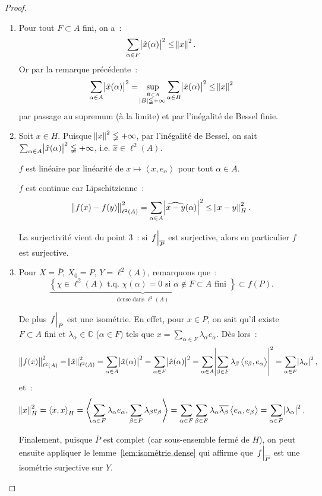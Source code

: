 \documentclass{report}
\newcommand{\C}{{\mathbb C}}
\newcommand{\scpr}[2]{\left\langle#1, #2\right\rangle}
\newcommand{\tq}{\text{ t.q. }}
\newcommand{\pinfty}{{+\infty}}
\newcommand{\restr}[2]{\left.#1\vphantom{\big|}\right|_{#2}}
\theoremstyle{definition}
\theoremstyle{remark}
\begin{document}
\begin{proof}~
\begin{enumerate}
	\item Pour tout $F \subset A$ fini, on a~:
	\[\sum_{\alpha \in F}\abs {\hat x(\alpha)}^2 \leq \norm x^2.\]
	Or par la remarque précédente~:
	\[\sum_{\alpha \in A}\abs {\hat x(\alpha)}^2 = \sup_{\stackrel {B \subset A}{\abs B \lneqq \pinfty}}\sum_{\alpha \in B}\abs {\hat x(\alpha)}^2 \leq \norm x^2\]
	par passage au supremum (à la limite) et par l'inégalité de Bessel finie.
	\item Soit $x \in H$. Puisque $\norm x^2 \lneqq \pinfty$, par l'inégalité de Bessel, on sait $\sum_{\alpha \in A}\abs {\hat x(\alpha)}^2 \lneqq \pinfty$, i.e. $\hat x \in \ell^2(A)$.

	$f$ est linéaire par linéarité de $x \mapsto \scpr x{e_\alpha}$ pour tout $\alpha \in A$.

	$f$ est continue car Lipschitzienne~:
	\[\norm {f(x)-f(y)}_{\ell^2(A)}^2 = \sum_{\alpha \in A}\abs {\widehat {x-y}(\alpha)}^2 \leq \norm {x-y}_H^2.\]

	La surjectivité vient du point 3~: si $\restr f{\overline P}$ est surjective, alors en particulier $f$ est surjective.
	\item Pour $X = \overline P$, $X_0 = P$, $Y = \ell^2(A)$, remarquons que~:
	\[\underbrace {\left\{\chi \in \ell^2(A) \tq \chi(\alpha) = 0 \text{ si } \alpha \not \in F \subset A \text{ fini }\right\}}_{\text{dense dans } \ell^2(A)} \subset f(P).\]

	De plus $\restr fP$ est une isométrie. En effet, pour $x \in P$, on sait qu'il existe $F \subset A$ fini et $\lambda_\alpha \in \C$ ($\alpha \in F$) tels que
	$x = \sum_{\alpha \in F}\lambda_\alpha e_\alpha$. Dès lors~:
	\[\norm {f(x)}_{\ell^2(A)}^2 = \norm {\hat x}_{\ell^2(A)}^2 = \sum_{\alpha \in A}\abs {\hat x(\alpha)}^2 = \sum_{\alpha \in F}\abs {\hat x(\alpha)}^2
	= \sum_{\alpha \in A}\abs {\sum_{\beta \in F}\lambda_\beta \scpr {e_\beta}{e_\alpha}}^2 = \sum_{\alpha \in F}\abs {\lambda_\alpha}^2,\]
	et~:
	\[\norm x_H^2 = \scpr xx_H = \scpr {\sum_{\alpha \in F}\lambda_\alpha e_\alpha}{\sum_{\beta \in F}\lambda_\beta e_\beta}
	= \sum_{\alpha \in F}\sum_{\beta \in F}\lambda_\alpha\overline {\lambda_\beta}\scpr {e_\alpha}{e_\beta} = \sum_{\alpha \in F}\abs {\lambda_\alpha}^2.\]

	Finalement, puisque $\overline P$ est complet (car sous-ensemble fermé de $H$), on peut ensuite appliquer le lemme~\ref{lem:isométrie dense} qui affirme que
	$\restr f{\overline P}$ est une isométrie surjective sur $Y$.
\end{enumerate}
\end{proof}
\end{document}
